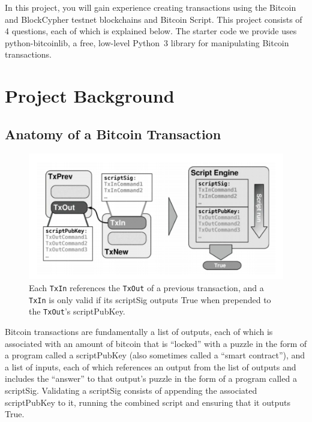 \documentclass[11pt]{article}
\begin{document}
\newlength{\boxwidth}
\setlength{\boxwidth}{\textwidth}
\addtolength{\boxwidth}{-2cm}

\vspace{1cm}
In this project, you will gain experience creating transactions using the Bitcoin and BlockCypher testnet blockchains and Bitcoin Script.
This project consists of 4 questions, each of which is explained below. The starter code we provide uses python-bitcoinlib, a free, low-level Python~3 library for manipulating Bitcoin transactions.

\section{Project Background}

\subsection{Anatomy of a Bitcoin Transaction}
\begin{figure}[h!]
  \centering
  \includegraphics[width=.75\textwidth]{txin_txout.png}
  \caption{Each \texttt{TxIn} references the \texttt{TxOut} of a previous
    transaction, and a \texttt{TxIn} is only valid if its scriptSig outputs
  True when prepended to the \texttt{TxOut}'s scriptPubKey.}
\end{figure}

Bitcoin transactions are fundamentally a list of outputs, each of which is associated with an amount of bitcoin that is ``locked'' with a puzzle in the form of a program called a scriptPubKey (also sometimes called a ``smart contract''), and a list of inputs, each of which references an output from the list of outputs and includes the ``answer'' to that output's puzzle in the form of a program called a scriptSig.
Validating a scriptSig consists of appending the associated scriptPubKey to it, running the combined script and ensuring that it outputs True.
\end{document}
